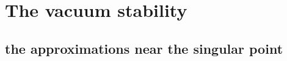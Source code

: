 \documentclass{article}
\begin{document}
\section{The vacuum stability}
\subsection{the approximations near the singular point}
\end{document}
